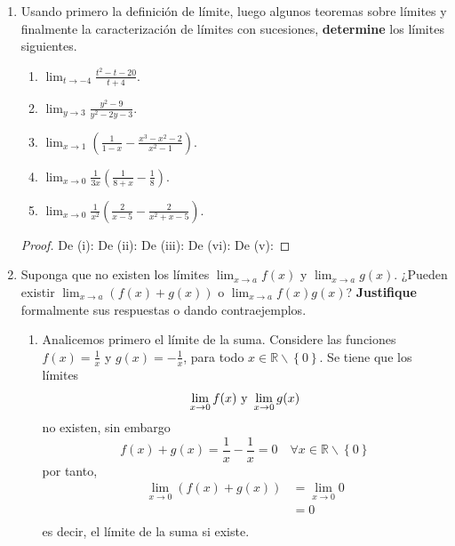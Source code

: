 \documentclass[12pt]{article}
\begin{document}
\begin{enumerate}
\begin{proof}
        De (ii): 
    \end{proof}

    \item Usando primero la definición de límite, luego algunos teoremas sobre límites y finalmente la caracterización de límites con sucesiones, \textbf{determine} los límites siguientes.
    \begin{enumerate}
        \item $\lim_{t\rightarrow-4}\frac{t^2-t-20}{t+4}$.
        \item $\lim_{y\rightarrow3}\frac{y^2-9}{y^2-2y-3}$.
        \item $\lim_{x\rightarrow1}\left(\frac{1}{1-x}-\frac{x^3-x^2-2}{x^2-1}\right)$.
        \item $\lim_{x\rightarrow0}\frac{1}{3x}\left(\frac{1}{8+x}-\frac{1}{8}\right)$.
        \item $\lim_{x\rightarrow0}\frac{1}{x^2}\left(\frac{2}{x-5}-\frac{2}{x^2+x-5} \right)$.
    \end{enumerate}

    \begin{proof}
        De (i): 
        De (ii): 
        De (iii): 
        De (vi): 
        De (v):  
    \end{proof}

    \item Suponga que no existen los límites $\lim_{x\rightarrow a}f(x)$ y $\lim_{x\rightarrow a}g(x)$. ¿Pueden existir $\lim_{x\rightarrow a}(f(x)+g(x))$ o $\lim_{x\rightarrow a}f(x)g(x)$? \textbf{Justifique} formalmente sus respuestas o dando contraejemplos.
    \begin{sol}
        \begin{enumerate}
            \item Analicemos primero el límite de la suma. Considere las funciones $f(x)=\frac{1}{x}$ y $g(x)=-\frac{1}{x}$, para todo $x\in\mathbb{R}\backslash\left\{0 \right\}$. Se tiene que los límites
            \begin{equation*}
                \lim_{x\rightarrow 0}f(x)\textup{ y }\lim_{x\rightarrow 0}g(x)
            \end{equation*}
            no existen, sin embargo
            \begin{equation*}
                f(x)+g(x)=\frac{1}{x}-\frac{1}{x}=0\quad\forall x\in\mathbb{R}\backslash\left\{0 \right\}
            \end{equation*}
            por tanto,
            \begin{equation*}
                \begin{split}
                    \lim_{x\rightarrow0 }(f(x)+g(x))&=\lim_{x\rightarrow0 }0\\
                    &=0\\
                \end{split}
            \end{equation*}
            es decir, el límite de la suma si existe.


\end{enumerate}
\end{sol}
\end{enumerate}
\end{document}
